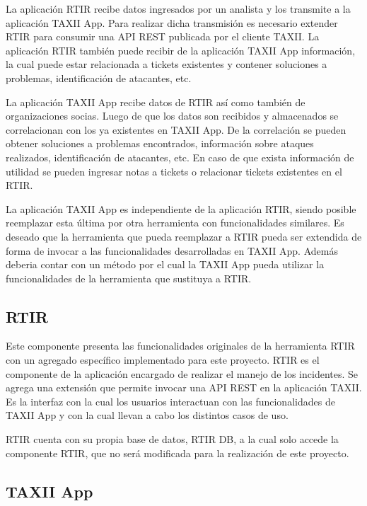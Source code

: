 	La aplicación RTIR recibe datos ingresados por un analista y los transmite a la aplicación
		TAXII App. Para realizar dicha transmisión es necesario extender RTIR para consumir una API REST publicada por el
		cliente TAXII. La aplicación RTIR también puede recibir de la aplicación TAXII App información, la cual puede
		estar relacionada a tickets existentes y contener soluciones a problemas, identificación de atacantes, etc.
	
	
	\bigskip
	
	La aplicación TAXII App recibe datos de RTIR así como también de organizaciones socias. Luego de que los datos son recibidos y almacenados se correlacionan con los ya existentes en TAXII App. De la
		correlación se pueden obtener soluciones a problemas encontrados, información sobre ataques realizados, identificación
		de atacantes, etc. En caso de que exista información de utilidad se pueden ingresar notas a tickets o relacionar
		tickets existentes en el RTIR.\\
	
	\bigskip
	
	La aplicación TAXII App es independiente de la aplicación RTIR, siendo posible reemplazar esta
		última por otra herramienta con funcionalidades similares. Es deseado que la herramienta que pueda reemplazar a RTIR
		pueda ser extendida de forma de invocar a las funcionalidades desarrolladas en TAXII App. Además deberia contar con un método por el
		cual la TAXII App pueda utilizar la funcionalidades de la herramienta que sustituya a RTIR.
	
	\subsection{RTIR}
	Este componente presenta las funcionalidades originales de la herramienta RTIR con un agregado
		específico implementado para este proyecto. RTIR es el componente de la aplicación encargado de realizar el manejo de
		los incidentes. Se agrega una extensión que permite invocar una API REST en la aplicación TAXII. Es la interfaz con la cual los usuarios interactuan con las funcionalidades de TAXII App y con la cual llevan a cabo los distintos casos de uso.
	\bigskip
	
	RTIR cuenta con su propia base de datos, RTIR DB, a la cual solo accede la componente RTIR, que no será modificada para la realización de este proyecto.
	
	
	\bigskip
	
	\subsection{TAXII App}
	
